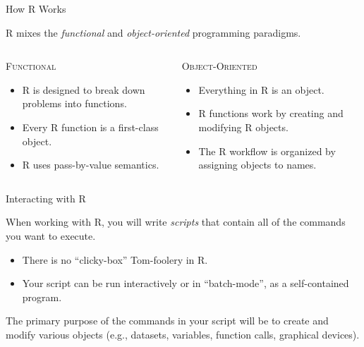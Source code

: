 \documentclass[10pt]{beamer}
\newcommand{\rmsc}[1]{\textrm{\textsc{#1}}}
\begin{document}

\begin{frame}{How R Works}
  
  R mixes the \emph{functional} and \emph{object-oriented} programming
  paradigms.
  \vc
  \begin{columns}
    \begin{column}{0.5\textwidth}
      
      \begin{center}
        \rmsc{Functional}
      \end{center}
      
      \begin{itemize}
      \item R is designed to break down problems into functions.
        \vc
      \item Every R function is a first-class object.
        \vc
      \item R uses pass-by-value semantics.
      \end{itemize}
      
    \end{column}
    \begin{column}{0.5\textwidth}
      
      \begin{center}
        \rmsc{Object-Oriented}
      \end{center}
      
      \begin{itemize}
      \item Everything in R is an object.
        \vc
      \item R functions work by creating and modifying R objects.
        \vc
      \item The R workflow is organized by assigning objects to names.
      \end{itemize}
      
    \end{column}
  \end{columns}
  
\end{frame}


\begin{frame}{Interacting with R}

  When working with R, you will write \emph{scripts} that contain all of the 
  commands you want to execute.
  \va
  \begin{itemize}
    \item There is no ``clicky-box'' Tom-foolery in R.
    \vb
    \item Your script can be run interactively or in ``batch-mode'', as a 
      self-contained program.
  \end{itemize}
  \va
  The primary purpose of the commands in your script will be to create and 
  modify various objects (e.g., datasets, variables, function calls, graphical 
  devices).

\end{frame}
\end{document}
